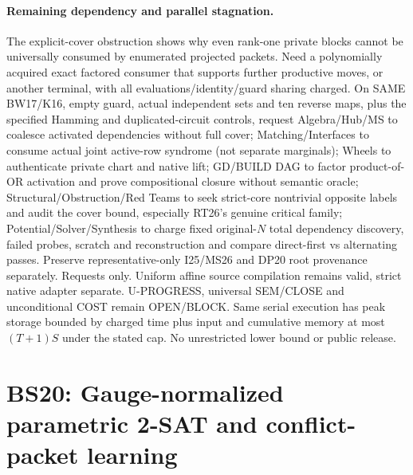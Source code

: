 \documentclass[11pt]{article}
\begin{document}
\paragraph{Remaining dependency and parallel stagnation.}
The explicit-cover obstruction shows why even rank-one private blocks cannot be universally consumed by enumerated projected packets. Need a polynomially acquired exact factored consumer that supports further productive moves, or another terminal, with all evaluations/identity/guard sharing charged. On SAME BW17/K16, empty guard, actual independent sets and ten reverse maps, plus the specified Hamming and duplicated-circuit controls, request Algebra/Hub/MS to coalesce activated dependencies without full cover; Matching/Interfaces to consume actual joint active-row syndrome (not separate marginals); Wheels to authenticate private chart and native lift; GD/BUILD DAG to factor product-of-OR activation and prove compositional closure without semantic oracle; Structural/Obstruction/Red Teams to seek strict-core nontrivial opposite labels and audit the cover bound, especially RT26's genuine critical family; Potential/Solver/Synthesis to charge fixed original-$N$ total dependency discovery, failed probes, scratch and reconstruction and compare direct-first vs alternating passes. Preserve representative-only I25/MS26 and DP20 root provenance separately. Requests only. Uniform affine source compilation remains valid, strict native adapter separate. U-PROGRESS, universal SEM/CLOSE and unconditional COST remain OPEN/BLOCK. Same serial execution has peak storage bounded by charged time plus input and cumulative memory at most $(T+1)S$ under the stated cap. No unrestricted lower bound or public release.


\section{BS20: Gauge-normalized parametric 2-SAT and conflict-packet learning}\label{sec:bs20}
\end{document}
